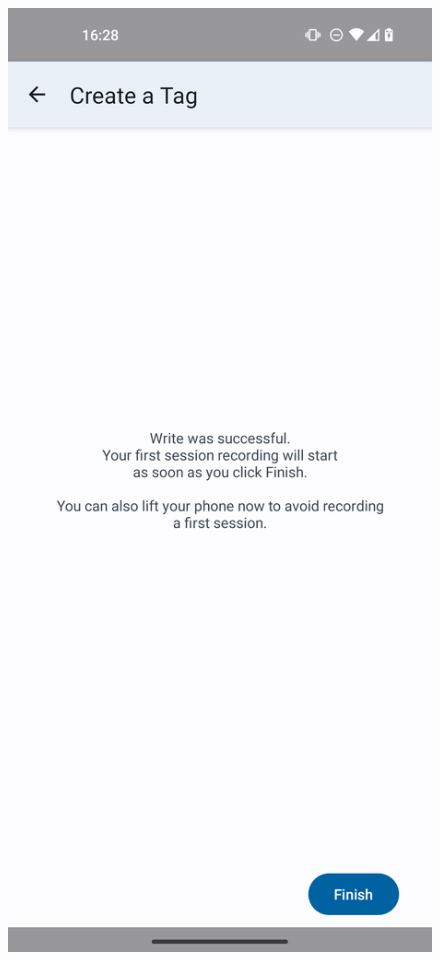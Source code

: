 \documentclass[conference]{IEEEtran}
\newcommand{\phonescreenwidth}{2.69in}
\begin{document}
\begin{figure}
\centering
\begin{minipage}{\phonescreenwidth}
	\includegraphics[width=\textwidth]{screenshots/s-success.png}

\end{minipage}
\end{figure}
\end{document}
